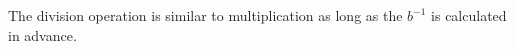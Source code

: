 \documentclass[journal]{IEEEtran}
\begin{document}
The division operation is similar to multiplication as long as the $b^{-1}$ is calculated in advance.

\ifCLASSOPTIONcaptionsoff
  \newpage
\fi





%
%
%







% 


\end{document}

